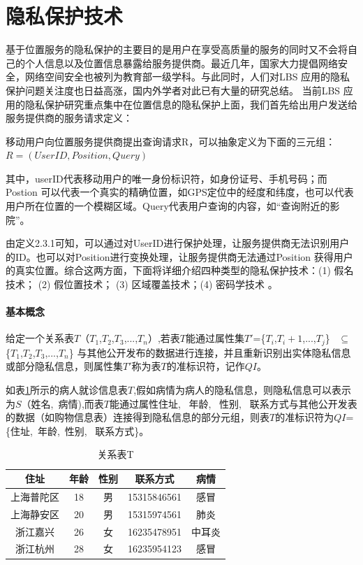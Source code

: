 \section{隐私保护技术}
基于位置服务的隐私保护的主要目的是用户在享受高质量的服务的同时又不会将自己的个人信息以及位置信息暴露给服务提供商。最近几年，国家大力提倡网络安全，网络空间安全也被列为教育部一级学科。与此同时，人们对LBS 应用的隐私保护问题关注度也日益高涨，国内外学者对此已有大量的研究总结\cite{group}\cite{Beresford}\cite{ChengR}。 当前LBS 应用的隐私保护研究重点集中在位置信息的隐私保护上面，我们首先给出用户发送给服务提供商的服务请求定义：
\begin{define}[：LBS服务请求]
移动用户向位置服务提供商提出查询请求R，可以抽象定义为下面的三元组：
$R=(UserID,Position,Query)$
\end{define}
其中，userID代表移动用户的唯一身份标识符，如身份证号、手机号码；而Postion 可以代表一个真实的精确位置，如GPS定位中的经度和纬度，也可以代表用户所在位置的一个模糊区域。Query代表用户查询的内容，如“查询附近的影院”。

由定义2.3.1可知，可以通过对UserID进行保护处理，让服务提供商无法识别用户的ID。也可以对Position进行变换处理，让服务提供商无法通过Position 获得用户的真实位置。综合这两方面，下面将详细介绍四种类型的隐私保护技术：(1) 假名技术； (2) 假位置技术； (3) 区域覆盖技术；(4) 密码学技术 。
\paragraph{基本概念}
\begin{define}[准标识符]
给定一个关系表$T$（$T_1$,$T_2$,$T_3$,...,$T_n$）,若表$T$能通过属性集$T'$=\{$T_i$,$T_i+1$,...,$T_j$\} ~$\subseteq$~ \{$T_1$,$T_2$,$T_3$,...,$T_n$\} 与其他公开发布的数据进行连接，并且重新识别出实体隐私信息或部分隐私信息，则属性集$T'$称为表$T$的准标识符，记作$QI$。
\end{define}

如表\ref{k-anony}所示的病人就诊信息表$T$,假如病情为病人的隐私信息，则隐私信息可以表示为$S$（姓名,~病情),而表$T$能通过属性{住址,~ 年龄,~ 性别,~ 联系方式}与其他公开发表的数据（如购物信息表）连接得到隐私信息的部分元组，则表$T$的准标识符为$QI$=\{住址,~年龄,~性别,~ 联系方式\}。
\begin{table}[H]
\centering  %
\begin{tabular}{ccccc}  %
\hline
住址 &年龄&性别 &联系方式&病情\\ \hline  %
上海普陀区&18 &男 &15315846561 &感冒\\         %
上海静安区 &20 &男 &15315974561 &肺炎\\        %
浙江嘉兴 &26 &女 &16235478951 &中耳炎\\
浙江杭州 &28 &女 &16235954123 &感冒\\ \hline
\end{tabular}
\caption{关系表T}\label{k-anony}
\end{table}

